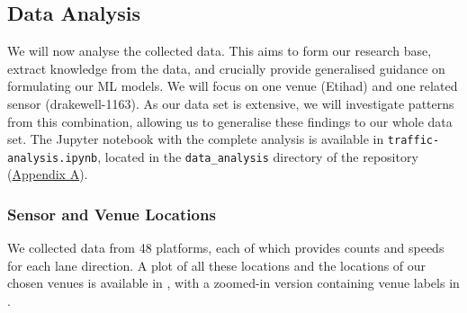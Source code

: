 \begin{table}[!ht]
    \centering
    \caption{Example event data record stored in InfluxDB.}
    \label{table:event_influx}
\end{table}


\subsection{Data Analysis}
\label{link:data-analysis}
We will now analyse the collected data. This aims to form our research base, extract knowledge from the data, and crucially provide generalised guidance on formulating our ML models. We will focus on one venue (Etihad) and one related sensor (drakewell-1163). As our data set is extensive, we will investigate patterns from this combination, allowing us to generalise these findings to our whole data set. The Jupyter notebook with the complete analysis is available in \verb|traffic-analysis.ipynb|, located in the \verb|data_analysis| directory of the repository (\hyperref[appdx:a]{Appendix A}).

\subsubsection{Sensor and Venue Locations} We collected data from 48 platforms, each of which provides counts and speeds for each lane direction. A plot of all these locations and the locations of our chosen venues is available in , with a zoomed-in version containing venue labels in .

